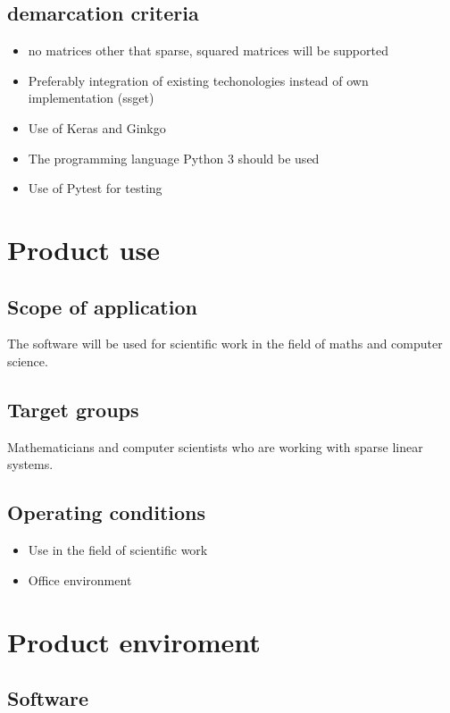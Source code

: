 \documentclass[parskip=full]{scrartcl}
\begin{document}
\subsection{demarcation criteria}
\begin{itemize}
\item no matrices other that sparse, squared matrices will be supported

\item Preferably integration of existing techonologies instead of own implementation (\gls{ssget})

\item Use of \gls{Keras} and \gls{Ginkgo}

\item The programming language \gls{Python} 3 should be used

\item Use of \gls{Pytest} for testing

\end{itemize}
\section{Product use}
\subsection{Scope of application}
The software will be used for scientific work in the field of maths and computer science.
\subsection{Target groups}
Mathematicians and computer scientists who are working with sparse linear systems.
\subsection{Operating conditions}

\begin{itemize}
\item Use in the field of scientific work
\item Office environment
\end{itemize}

\section{Product enviroment}


\subsection{Software}
\end{document}
